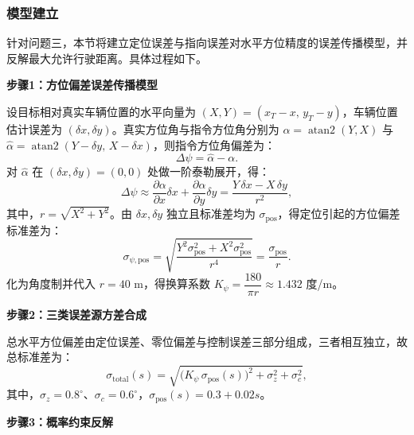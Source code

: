 
\subsubsection{模型建立}

针对问题三，本节将建立定位误差与指向误差对水平方位精度的误差传播模型，并反解最大允许行驶距离。具体过程如下。

\textbf{步骤1：方位偏差误差传播模型}

设目标相对真实车辆位置的水平向量为 $(X,Y)=(x_T-x,\,y_T-y)$，车辆位置估计误差为 $(\delta x,\delta y)$。真实方位角与指令方位角分别为 $\alpha=\operatorname{atan2}(Y,X)$ 与 $\hat\alpha=\operatorname{atan2}(Y-\delta y,\,X-\delta x)$，则指令方位角偏差为：
\begin{equation}
    \Delta\psi=\hat\alpha-\alpha .
\end{equation}
对 $\hat\alpha$ 在 $(\delta x,\delta y)=(0,0)$ 处做一阶泰勒展开，得：
\begin{equation}
    \Delta\psi \approx \frac{\partial\alpha}{\partial x}\delta x+\frac{\partial\alpha}{\partial y}\delta y
    =\frac{Y\,\delta x-X\,\delta y}{r^2},
\end{equation}
其中，$r=\sqrt{X^2+Y^2}$。由 $\delta x,\delta y$ 独立且标准差均为 $\sigma_{\mathrm{pos}}$，得定位引起的方位偏差标准差为：
\begin{equation}
    \sigma_{\psi,\mathrm{pos}}=\sqrt{\frac{Y^2\sigma_{\mathrm{pos}}^2+X^2\sigma_{\mathrm{pos}}^2}{r^4}}=\frac{\sigma_{\mathrm{pos}}}{r}.
\end{equation}
化为角度制并代入 $r=40$ m，得换算系数 $K_\psi=\dfrac{180}{\pi r}\approx 1.432$ 度/m。

\textbf{步骤2：三类误差源方差合成}

总水平方位偏差由定位误差、零位偏差与控制误差三部分组成，三者相互独立，故总标准差为：
\begin{equation}
    \sigma_{\mathrm{total}}(s)=\sqrt{\big(K_\psi\,\sigma_{\mathrm{pos}}(s)\big)^2+\sigma_z^2+\sigma_c^2},
\end{equation}
其中，$\sigma_z=0.8^\circ$、$\sigma_c=0.6^\circ$，$\sigma_{\mathrm{pos}}(s)=0.3+0.02s$。

\textbf{步骤3：概率约束反解}

